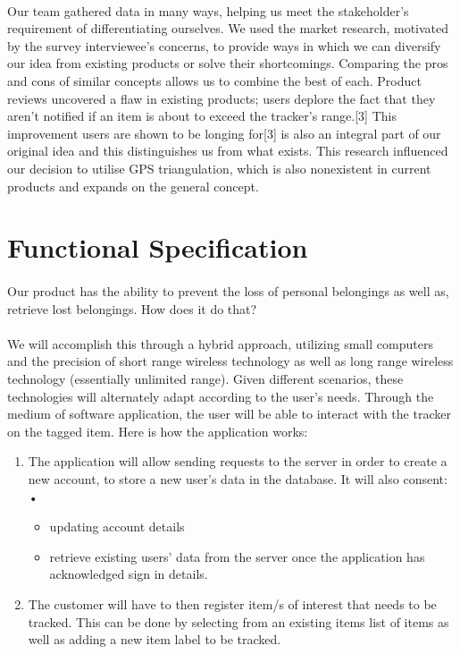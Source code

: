 \documentclass[12pt,a4paper]{article}
\begin{document}
      \paragraph{}
        Our team gathered data in many ways, helping us meet the stakeholder's requirement of differentiating ourselves. We used the market research, motivated by the survey interviewee’s concerns, to provide ways in which we can diversify our idea from existing products or solve their shortcomings. Comparing the pros and cons of similar concepts allows us to combine the best of each. Product reviews uncovered a flaw in existing products; users deplore the fact that they aren’t notified if an item is about to exceed the tracker's range.[3] This improvement users are shown to be longing for[3] is also an integral part of our original idea and this distinguishes us from what exists. This research influenced our decision to utilise GPS triangulation, which is also nonexistent in current products and expands on the general concept.
    
    \section{Functional Specification}
      \paragraph{}
        Our product has the ability to prevent the loss of personal belongings as well as, retrieve lost belongings. How does it do that?
      \paragraph{}
        We will accomplish this through a hybrid approach, utilizing small computers and the precision of short range wireless technology as well as long range wireless technology (essentially unlimited range). Given different scenarios, these technologies will alternately adapt according to the user’s needs. Through the medium of software application, the user will be able to interact with the tracker on the tagged item. Here is how the application works: 
      \begin{enumerate}  
        \item The application will allow sending requests to the server in order to create a new account, to store a new user’s data in the database. It will also consent: •	
        \begin{itemize}  
          \item updating account details
          \item retrieve existing users’ data from the server once the application has acknowledged sign in details.
        \end{itemize}
        \item The customer will have to then register item/s of interest that needs to be tracked. This can be done by selecting from an existing items list of items as well as adding a new item label to be tracked.
      \end{enumerate}
\end{document}
